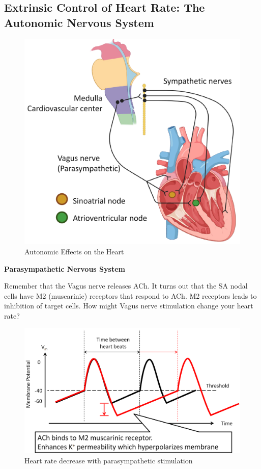 \documentclass[11pt,fleqn]{book} %
\begin{document}
\subsection{Extrinsic Control of Heart Rate: The Autonomic Nervous System}

\begin{figure}[h!]
\begin{center}
    \includegraphics[width=0.6\linewidth]{Pictures/Screenshot 2024-04-04 004942.png}
\end{center}
    \caption{Autonomic Effects on the Heart}
\end{figure}

\textbf{Parasympathetic Nervous System}

\begin{exercise}
Remember that the Vagus nerve releases ACh.
It turns out that the SA nodal cells have M2
(muscarinic) receptors that respond to ACh. M2
receptors leads to inhibition of target cells.
How might Vagus nerve stimulation change
your heart rate?
\end{exercise}


\begin{figure}[h!]
\begin{center}
    \includegraphics[width=0.6\linewidth]{Pictures/Screenshot 2024-04-04 011648.png}
\end{center}
    \caption{Heart rate decrease with parasympathetic stimulation}
\end{figure}
\end{document}
